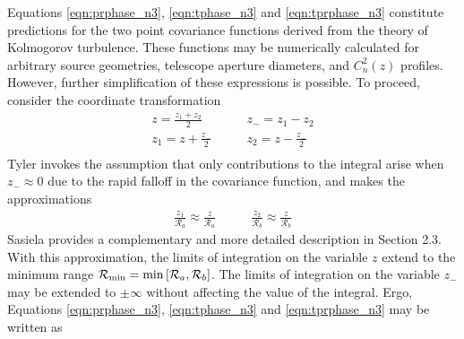 Equations \ref{eqn:prphase_n3}, \ref{eqn:tphase_n3} and \ref{eqn:tprphase_n3}
constitute predictions for the two point covariance functions derived
from the theory of Kolmogorov turbulence.  These functions may be
numerically calculated for arbitrary source geometries, telescope
aperture diameters, and $C_{n}^{2}(z)$ profiles.  However, further
simplification of these expressions is possible.  To proceed, consider
the coordinate transformation
\begin{equation}
\begin{aligned}
z = \frac{z_{1}+z_{2}}{2} \quad & \quad z_{-} = z_{1}-z_{2} \\
z_{1} = z+\frac{z_{-}}{2} \quad & \quad z_{2} = z-\frac{z_{-}}{2} \\
\end{aligned}
\end{equation}
Tyler invokes the assumption that only contributions to the integral
arise when $z_{-} \approx 0$ due to the rapid falloff in the
covariance function, and makes the approximations
\begin{equation}
\begin{aligned}
\frac{z_{1}}{\mathcal{R}_{a}} \approx \frac{z}{\mathcal{R}_{a}} \quad & \quad \frac{z_{2}}{\mathcal{R}_{b}} \approx \frac{z}{\mathcal{R}_{b}} 
\end{aligned}
\end{equation}
Sasiela \cite{Sasiela:2012} provides a complementary and
more detailed description in Section 2.3.  With this approximation,
the limits of integration on the variable $z$ extend to the minimum
range $\mathcal{R}_{\rm min} = {\rm min}\left[\mathcal{R}_{a},
  \mathcal{R}_{b}\right]$.  The limits of integration on the variable
$z_{-}$ may be extended to $\pm\infty$ without affecting the value of
the integral.  Ergo, Equations \ref{eqn:prphase_n3},
\ref{eqn:tphase_n3} and \ref{eqn:tprphase_n3} may be written as
